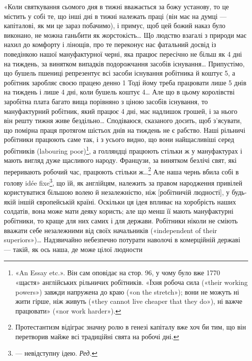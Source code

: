 
«Коли святкування сьомого дня в тижні вважається за божу
установу, то це містить у собі те, що інші дні в тижні належать
праці (він має на думці — капіталові, як ми це зараз побачимо),
і примус, щоб цей божий наказ було виконано, не можна ганьбити
як жорстокість\dots{} Що людство взагалі з природи має нахил до
комфорту і лінощів, про те переконує нас фатальний досвід із
поведінкою нашої мануфактурної черні, яка працює пересічно
не більш як 4 дні на тиждень, за винятком випадків подорожчання
засобів існування\dots{} Припустімо, що бушель пшениці репрезентує
всі засоби існування робітника й коштує 5, а робітник
заробляє своєю працею денно 1 Тоді йому треба працювати
лише 5 днів на тиждень і лише 4 дні, коли бушель коштує
4\dots{} Але що в цьому королівстві заробітна плата багато
вища порівняно з ціною засобів існування, то мануфактурний
робітник, який працює 4 дні, має надлишок грошей, і за нього
він решту тижня живе бездільно\dots{} Сподіваюся, сказаного досить,
щоб з’ясувати, що помірна праця протягом шістьох днів на тиждень
не є рабство. Наші рільничі робітники працюють саме так,
і з усього видно, що вони найщасливіші серед робітників (labouring
poor)\footnote{
«An Essay etc.». Він сам оповідає на стор. 96, у чому було вже
1770~ «щастя» англійських рільничих робітників. «Їхня робоча сила
(«their working powers») завжди напружена до краю («on the stretch»);
вони не можуть ні жити гірше, ніж живуть («they cannot live cheaper
that they do»), ні важче працювати» («nor work harder»).
}, а голляндці працюють стільки ж у мануфактурах і мають
вигляд дуже щасливого народу. Французи, за винятком безлічі
свят, які переривають робочий час, працюють стільки ж\dots{}\footnote{
Протестантизм відіграє значну ролю в генезі капіталу вже хоч
би тим, що він перетворив майже всі традиційні свята на робочі дні.
}
Але наша чернь вбила собі в голову idée fixe\footnote*{
— невідступну ідею. \emph{Ред.}
}, що їй, як англійцям,
належить за правом народження привілей користуватися більшою
волею й незалежністю, ніж [робітничій людності], у будь-якій
іншій європейській країні. Оскільки ця ідея впливає на
хоробрість наших солдатів, вона може мати деяку користь; але
що менш її мають мануфактурні робітники, то краще для них
самих і для держави. Робітники ніколи не сміють вважати себе
незалежними від своїх начальників («independent of their superiors»)\dots{}
Надзвичайно небезпечно потурати наволочі в комерційній
державі — такій, як ось наша, де може  цілої людности
